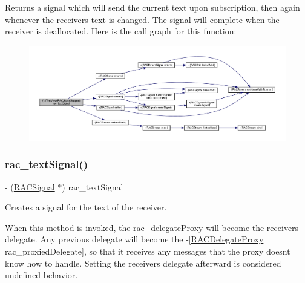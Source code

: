 Returns a signal which will send the current text upon subscription, then again whenever the receiver\textquotesingle{}s text is changed. The signal will complete when the receiver is deallocated. Here is the call graph for this function\+:\nopagebreak
\begin{figure}[H]
\begin{center}
\leavevmode
\includegraphics[width=350pt]{category_u_i_text_view_07_r_a_c_signal_support_08_aad510c683b60bb5788035a21f860690d_cgraph}
\end{center}
\end{figure}
\mbox{\label{category_u_i_text_view_07_r_a_c_signal_support_08_aad510c683b60bb5788035a21f860690d}} 
\subsubsection{\texorpdfstring{rac\+\_\+text\+Signal()}{rac\_textSignal()}\hspace{0.1cm}{\footnotesize\ttfamily [2/3]}}
{\footnotesize\ttfamily -\/ (\mbox{\hyperlink{interface_r_a_c_signal}{R\+A\+C\+Signal}} $\ast$) rac\+\_\+text\+Signal \begin{DoxyParamCaption}{ }\end{DoxyParamCaption}}

Creates a signal for the text of the receiver.

When this method is invoked, the {\ttfamily rac\+\_\+delegate\+Proxy} will become the receiver\textquotesingle{}s delegate. Any previous delegate will become the -\/\mbox{[}\mbox{\hyperlink{interface_r_a_c_delegate_proxy}{R\+A\+C\+Delegate\+Proxy}} rac\+\_\+proxied\+Delegate\mbox{]}, so that it receives any messages that the proxy doesn\textquotesingle{}t know how to handle. Setting the receiver\textquotesingle{}s {\ttfamily delegate} afterward is considered undefined behavior.

